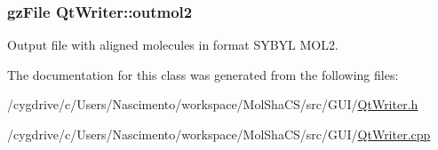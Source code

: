 \hypertarget{classQtWriter_a41ae23e5a7e0c18505f3a7c654c672b7}{
\subsubsection[{outmol2}]{\setlength{\rightskip}{0pt plus 5cm}gzFile {\bf QtWriter::outmol2}}}
\label{classQtWriter_a41ae23e5a7e0c18505f3a7c654c672b7}


Output file with aligned molecules in format SYBYL MOL2. 



The documentation for this class was generated from the following files:\begin{DoxyCompactItemize}
\item 
/cygdrive/c/Users/Nascimento/workspace/MolShaCS/src/GUI/\hyperlink{QtWriter_8h}{QtWriter.h}\item 
/cygdrive/c/Users/Nascimento/workspace/MolShaCS/src/GUI/\hyperlink{QtWriter_8cpp}{QtWriter.cpp}\end{DoxyCompactItemize}
